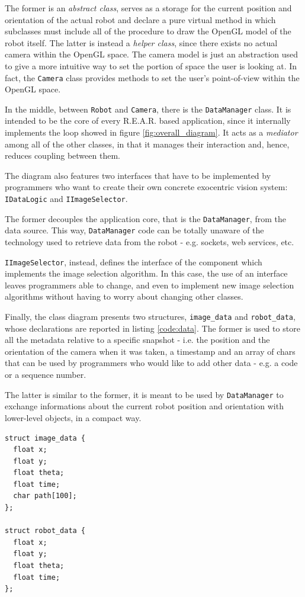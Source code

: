 %
The former is an \textit{abstract class}, serves as a storage 
for the current position and orientation of the actual
robot and declare a pure virtual method in which subclasses 
must include all of the procedure to draw the OpenGL model 
of the robot itself.
%
The latter is instead a \textit{helper class}, since there 
exists no actual camera within the OpenGL space. The camera 
model is just an abstraction used to give a more intuitive
way to set the portion of space the user is looking at.
In fact, the \texttt{Camera} class provides methods to 
set the user's point-of-view within the OpenGL space.
%

%
In the middle, between \texttt{Robot} and \texttt{Camera},
there is the \texttt{DataManager} class. It is intended to be 
the core of every \textsf{R.E.A.R.} based application, since it 
internally implements the loop showed in figure 
\ref{fig:overall_diagram}.
It acts as a \textit{mediator} among all of the other classes, 
in that it manages their interaction and, hence, reduces 
coupling between them.
%

%
The diagram also features two interfaces that have to be implemented 
by programmers who want to create their own concrete exocentric 
vision system: \texttt{IDataLogic} and 
\texttt{IImageSelector}.
%

%
The former decouples the application 
core, that is the \texttt{DataManager}, from the data source.
This way, \texttt{DataManager} code can be totally unaware of 
the technology used to retrieve data from the robot - e.g. 
sockets, web services, etc.
%

%
\texttt{IImageSelector}, instead, defines the interface 
of the component which implements the image selection algorithm.
%
In this case, the use of an interface leaves programmers 
able to change, and even to implement new image 
selection algorithms without having to worry about
changing other classes.
%

%
Finally, the class diagram presents two structures, 
\texttt{image\_data} and \texttt{robot\_data}, whose 
declarations are reported in listing \ref{code:data}.
%
The former is used to store all the metadata 
relative to a specific snapshot - i.e. the position 
and the orientation of the camera when it was taken, 
a timestamp and an array of chars that can be used by 
programmers who would like to add other data - e.g. 
a code or a sequence number.
%

%
The latter is similar to the former, it is meant to be 
used by \texttt{DataManager} to exchange informations
about the current robot position and orientation with 
lower-level objects, in a compact way.
%
\begin{lstlisting}[caption={\textsf{R.E.A.R.} data structures}, label={code:data}, frame=trBL]
struct image_data {
  float x;
  float y;
  float theta;
  float time;
  char path[100];
};

struct robot_data {
  float x;
  float y;
  float theta;
  float time;
};
\end{lstlisting}
%


